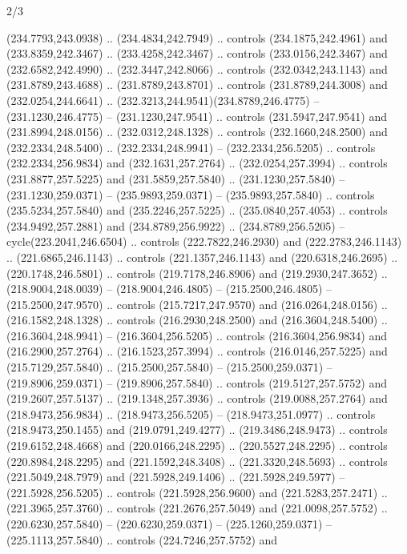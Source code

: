 \begin{flagdescription}{2/3}
\begin{scope}[xshift=0.5\flaglength,yshift=0.5\flagwidth,scale=\flagwidth/235.81]
\begin{scope}[y=0.8pt, x=0.8pt, yscale=-1,shift={(-239.08,-147.38)}]
    (234.7793,243.0938) .. (234.4834,242.7949) .. controls (234.1875,242.4961) and
    (233.8359,242.3467) .. (233.4258,242.3467) .. controls (233.0156,242.3467) and
    (232.6582,242.4990) .. (232.3447,242.8066) .. controls (232.0342,243.1143) and
    (231.8789,243.4688) .. (231.8789,243.8701) .. controls (231.8789,244.3008) and
    (232.0254,244.6641) .. (232.3213,244.9541)(234.8789,246.4775) --
    (231.1230,246.4775) -- (231.1230,247.9541) .. controls (231.5947,247.9541) and
    (231.8994,248.0156) .. (232.0312,248.1328) .. controls (232.1660,248.2500) and
    (232.2334,248.5400) .. (232.2334,248.9941) -- (232.2334,256.5205) .. controls
    (232.2334,256.9834) and (232.1631,257.2764) .. (232.0254,257.3994) .. controls
    (231.8877,257.5225) and (231.5859,257.5840) .. (231.1230,257.5840) --
    (231.1230,259.0371) -- (235.9893,259.0371) -- (235.9893,257.5840) .. controls
    (235.5234,257.5840) and (235.2246,257.5225) .. (235.0840,257.4053) .. controls
    (234.9492,257.2881) and (234.8789,256.9922) .. (234.8789,256.5205) --
    cycle(223.2041,246.6504) .. controls (222.7822,246.2930) and
    (222.2783,246.1143) .. (221.6865,246.1143) .. controls (221.1357,246.1143) and
    (220.6318,246.2695) .. (220.1748,246.5801) .. controls (219.7178,246.8906) and
    (219.2930,247.3652) .. (218.9004,248.0039) -- (218.9004,246.4805) --
    (215.2500,246.4805) -- (215.2500,247.9570) .. controls (215.7217,247.9570) and
    (216.0264,248.0156) .. (216.1582,248.1328) .. controls (216.2930,248.2500) and
    (216.3604,248.5400) .. (216.3604,248.9941) -- (216.3604,256.5205) .. controls
    (216.3604,256.9834) and (216.2900,257.2764) .. (216.1523,257.3994) .. controls
    (216.0146,257.5225) and (215.7129,257.5840) .. (215.2500,257.5840) --
    (215.2500,259.0371) -- (219.8906,259.0371) -- (219.8906,257.5840) .. controls
    (219.5127,257.5752) and (219.2607,257.5137) .. (219.1348,257.3936) .. controls
    (219.0088,257.2764) and (218.9473,256.9834) .. (218.9473,256.5205) --
    (218.9473,251.0977) .. controls (218.9473,250.1455) and (219.0791,249.4277) ..
    (219.3486,248.9473) .. controls (219.6152,248.4668) and (220.0166,248.2295) ..
    (220.5527,248.2295) .. controls (220.8984,248.2295) and (221.1592,248.3408) ..
    (221.3320,248.5693) .. controls (221.5049,248.7979) and (221.5928,249.1406) ..
    (221.5928,249.5977) -- (221.5928,256.5205) .. controls (221.5928,256.9600) and
    (221.5283,257.2471) .. (221.3965,257.3760) .. controls (221.2676,257.5049) and
    (221.0098,257.5752) .. (220.6230,257.5840) -- (220.6230,259.0371) --
    (225.1260,259.0371) -- (225.1113,257.5840) .. controls (224.7246,257.5752) and

\end{scope}
\end{scope}
\end{flagdescription}
